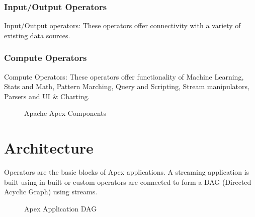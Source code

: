 \documentclass[9pt,twocolumn,twoside]{../../styles/osajnl}
\begin{document}
\subsubsection{Input/Output Operators}
Input/Output operators: These operators offer connectivity with a variety of existing data sources.
\subsubsection{Compute Operators}
Compute Operators: These operators offer functionality of Machine Learning, Stats and Math, Pattern Marching, Query and Scripting, Stream manipulators, Parsers and UI \& Charting.
\begin{figure}[ht!]
\centering
{}
\caption{Apache Apex Components \cite{www-apacheapexblog}}
\label{fig:Apache Apex Components}
\end{figure}




\section{Architecture}

Operators are the basic blocks of Apex applications. A streaming application is built using in-built or custom operators are connected to form a DAG (Directed Acyclic Graph) using streams. 
\begin{figure}[ht!]
\centering
{}
\caption{Apex Application DAG \cite{www-apacheapexappdevdoc}}
\label{fig:Apex Application DAG}
\end{figure}
\end{document}
